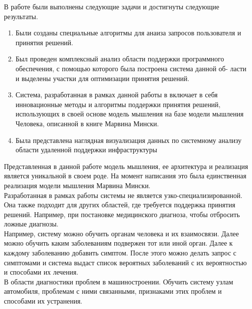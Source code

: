 
В работе были выполнены следующие задачи и достигнуты следующие результаты.
\begin{enumerate}
  \item Были созданы специальные алгоритмы для анаиза запросов пользователя и принятия решений. 
  \item Был проведен комплексный анализ области поддержки программного обеспечения, с помощью которого была построена система данной об- ласти и выделены участки для оптимизации принятия решений.  
  \item Система, разработанная в рамках данной работы в включает в себя инновационные методы и алгоритмы поддержки принятия решений, использующих в своей основе модель мышления на базе модели мышления Человека, описанной в книге Марвина Мински. 
  \item Была представлена наглядная визуализация данных по системному анализу области удаленной поддержки инфраструктуры
\end{enumerate}

Представленная в данной работе модель мышления, ее архитектура и реализация является уникальной в своем роде. На момент написания это была единственная реализация модели мышления Марвина Мински. \\
Разработанная в рамках работы системы не является узко-специализированной. Она также подходит для других областей, где требуется поддержка принятия решений. Например, при постановке медицинского диагноза, чтобы отбросить ложные диагнозы. \\
Например, систему можно обучить органам человека и их взаимосвязи. Далее можно обучить каким заболеваниям подвержен тот или иной орган. Далее к каждому заболеванию добавить симптом. После этого можно делать запрос с симптомами и система выдаст список вероятных заболеваний с их вероятностью и способами их лечения. \\
В области диагностики проблем в машиностроении. Обучить систему узлам автомобиля, проблемам с ними связанными, признаками этих проблем и способами их устранения. 



